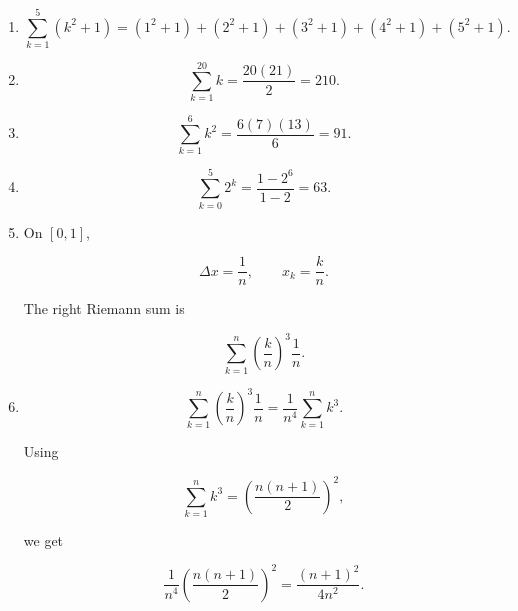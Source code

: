 \begin{enumerate}
\item
\[
\sum_{k=1}^{5}(k^2+1)
=
(1^2+1)+(2^2+1)+(3^2+1)+(4^2+1)+(5^2+1).
\]

\item
\[
\sum_{k=1}^{20}k=\frac{20(21)}2=210.
\]

\item
\[
\sum_{k=1}^{6}k^2=\frac{6(7)(13)}6=91.
\]

\item
\[
\sum_{k=0}^{5}2^k=\frac{1-2^6}{1-2}=63.
\]

\item
On \([0,1]\),

\[
\Delta x=\frac1n,
\qquad
x_k=\frac{k}{n}.
\]

The right Riemann sum is

\[
\sum_{k=1}^{n}\left(\frac{k}{n}\right)^3\frac1n.
\]

\item
\[
\sum_{k=1}^{n}\left(\frac{k}{n}\right)^3\frac1n
=
\frac1{n^4}\sum_{k=1}^{n}k^3.
\]

Using

\[
\sum_{k=1}^{n}k^3=\left(\frac{n(n+1)}2\right)^2,
\]

we get

\[
\frac1{n^4}\left(\frac{n(n+1)}2\right)^2
=
\frac{(n+1)^2}{4n^2}.
\]
\end{enumerate}